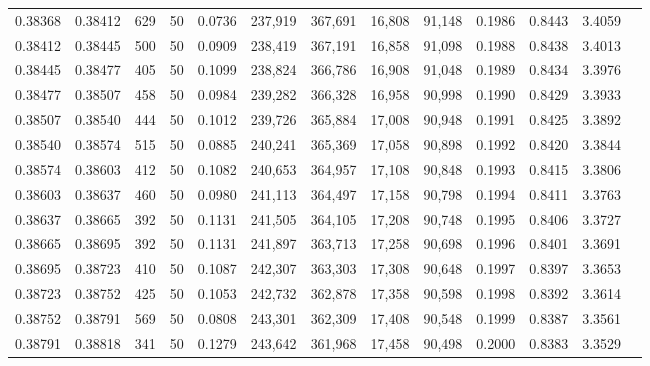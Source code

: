 \begin{tabular}{rrrrrrrrrrrrr}
0.38368 & 0.38412 &   629 &  50 &                                     0.0736 & 237,919 & 367,691 &  16,808 &  91,148 & 0.1986 & 0.8443 & 3.4059 \\
0.38412 & 0.38445 &   500 &  50 &                                     0.0909 & 238,419 & 367,191 &  16,858 &  91,098 & 0.1988 & 0.8438 & 3.4013 \\
0.38445 & 0.38477 &   405 &  50 &                                     0.1099 & 238,824 & 366,786 &  16,908 &  91,048 & 0.1989 & 0.8434 & 3.3976 \\
0.38477 & 0.38507 &   458 &  50 &                                     0.0984 & 239,282 & 366,328 &  16,958 &  90,998 & 0.1990 & 0.8429 & 3.3933 \\
0.38507 & 0.38540 &   444 &  50 &                                     0.1012 & 239,726 & 365,884 &  17,008 &  90,948 & 0.1991 & 0.8425 & 3.3892 \\
0.38540 & 0.38574 &   515 &  50 &                                     0.0885 & 240,241 & 365,369 &  17,058 &  90,898 & 0.1992 & 0.8420 & 3.3844 \\
0.38574 & 0.38603 &   412 &  50 &                                     0.1082 & 240,653 & 364,957 &  17,108 &  90,848 & 0.1993 & 0.8415 & 3.3806 \\
0.38603 & 0.38637 &   460 &  50 &                                     0.0980 & 241,113 & 364,497 &  17,158 &  90,798 & 0.1994 & 0.8411 & 3.3763 \\
0.38637 & 0.38665 &   392 &  50 &                                     0.1131 & 241,505 & 364,105 &  17,208 &  90,748 & 0.1995 & 0.8406 & 3.3727 \\
0.38665 & 0.38695 &   392 &  50 &                                     0.1131 & 241,897 & 363,713 &  17,258 &  90,698 & 0.1996 & 0.8401 & 3.3691 \\
0.38695 & 0.38723 &   410 &  50 &                                     0.1087 & 242,307 & 363,303 &  17,308 &  90,648 & 0.1997 & 0.8397 & 3.3653 \\
0.38723 & 0.38752 &   425 &  50 &                                     0.1053 & 242,732 & 362,878 &  17,358 &  90,598 & 0.1998 & 0.8392 & 3.3614 \\
0.38752 & 0.38791 &   569 &  50 &                                     0.0808 & 243,301 & 362,309 &  17,408 &  90,548 & 0.1999 & 0.8387 & 3.3561 \\
0.38791 & 0.38818 &   341 &  50 &                                     0.1279 & 243,642 & 361,968 &  17,458 &  90,498 & 0.2000 & 0.8383 & 3.3529 \\

\end{tabular}
